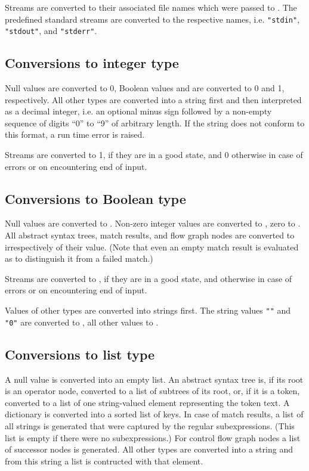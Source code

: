Streams are converted to their associated file names
which were passed to . The predefined
standard streams are converted to the respective names,
i.e. \lstinline!"stdin"!, \lstinline!"stdout"!, and
\lstinline!"stderr"!.

\subsection{Conversions to integer type}\label{intconv}

Null values are converted to 0, Boolean values  and
 are converted to 0 and 1, respectively. All other types are
converted into a string first and then interpreted as a decimal integer,
i.e. an optional minus sign followed by a non-empty sequence of digits
``0'' to ``9'' of arbitrary length. If the string does not conform to
this format, a run time error is raised.

Streams are converted to 1, if they are in a good
state, and 0 otherwise in case of errors or on encountering end
of input.

\subsection{Conversions to Boolean type}\label{boolconv}

Null values are converted to .
Non-zero integer values are converted to , zero to .
All abstract syntax trees, match results, and flow graph nodes are
converted to  irrespectively of their value. (Note that
even an empty match result is evaluated as  to distinguish
it from a failed match.)

Streams are converted to , if they are
in a good state, and  otherwise in case of errors or on
encountering end of input.

Values of other types are converted into
strings first. The string values \lstinline!""! and \lstinline!"0"!
are converted to , all other values to .

\subsection{Conversions to list type}

\label{listconv}
A null value is converted into an empty list. An abstract syntax tree
is, if its root is an operator node, converted to a list of subtrees of
its root, or, if it is a token, converted to a list of one string-valued
element representing the token text. A dictionary is converted into a
sorted list of keys. In case of match results, a list of all strings
is generated that were captured by the regular subexpressions. (This
list is empty if there were no subexpressions.) For control flow graph
nodes a list of successor nodes is generated. All other types are
converted into a string and from this string a list is contructed with
that element.

